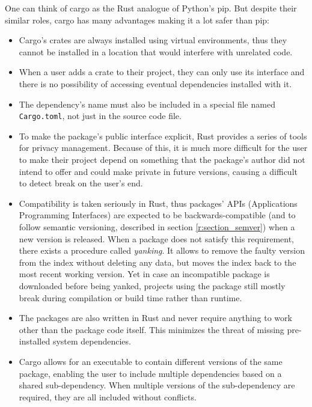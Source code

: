\documentclass[licencjacka,en]{pracamgr}
\begin{document}
One can think of cargo as the Rust analogue of Python's pip. But despite their similar roles,
cargo has many advantages making it a lot safer than pip:
\begin{itemize}
	\item Cargo's crates are always installed using virtual environments, thus they cannot be
		installed in a location that would interfere with unrelated code.
	\item When a user adds a crate to their project, they can only use its interface and there is
		no possibility of accessing eventual dependencies installed with it.
	\item The dependency's name must also be included in a special file named \texttt{Cargo.toml},
		not just in the source code file.
	\item To make the package's public interface explicit, Rust provides a series of tools for
		privacy management. Because of this, it is much more difficult for the user to make their
		project depend on something that the package's author did not intend to offer and could
		make private in future versions, causing a difficult to detect break on the user's end.
	\item Compatibility is taken seriously in Rust, thus packages' APIs (Applications Programming Interfaces) are expected to be
		backwards-compatible (and to follow semantic versioning, described in section \ref{r:section_semver}) when
		a new version is released. When a package does not satisfy this requirement, there exists
		a procedure called \textit{yanking}. It allows to remove the faulty version from the index
		without deleting any data, but moves the index back to the most recent working version.
		Yet in case an incompatible package is downloaded before being yanked, projects using the
		package still mostly break during compilation or build time rather than runtime.
	\item The packages are also written in Rust and never require anything to work other than the
		package code itself. This minimizes the threat of missing pre-installed
		system dependencies.
	\item Cargo allows for an executable to contain different versions of the same package,
		enabling the user to include multiple dependencies based on a shared sub-dependency.
		When multiple versions of the sub-dependency are required, they are all included
		without conflicts.
\end{itemize}
\end{document}
